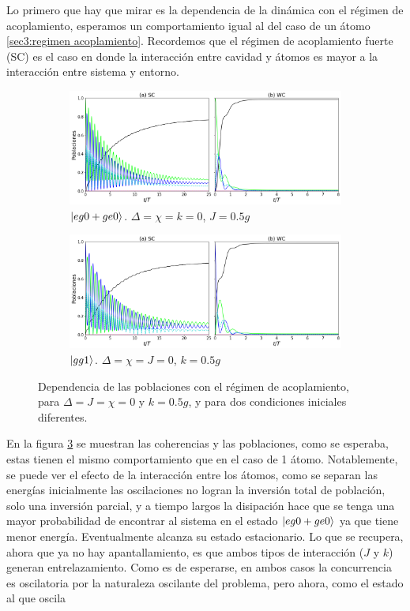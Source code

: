 Lo primero que hay que mirar es la dependencia de la dinámica con el régimen de acoplamiento, esperamos un comportamiento igual al del caso de un átomo \ref{sec3:regimen acoplamiento}. Recordemos que el régimen de acoplamiento fuerte (SC) es el caso en donde la interacción entre cavidad y átomos es mayor a la interacción entre sistema y entorno.
\begin{figure}[h]
    \centering
    \begin{subfigure}{0.7\textwidth}
        \includegraphics[width=\textwidth]{figuras/ch4/sc vs wc eg0 sim j0.5.png}
        \caption{$\ket{eg0+ge0}$. $\Delta=\chi=k=0$, $J=0.5g$}
        \label{fig4:acoplamiento eg0 sim}
    \end{subfigure}
    \vfill
    \begin{subfigure}{0.7\textwidth}
        \includegraphics[width=\textwidth]{figuras/ch4/sc vs wc gg1 k=0.5.png}
        \caption{$\ket{gg1}$. $\Delta=\chi=J=0$, $k=0.5g$ }
        \label{fig4:acoplamiento gg1}
    \end{subfigure}
    \caption{Dependencia de las poblaciones con el régimen de acoplamiento, para $\Delta=J=\chi=0$ y $k=0.5g$, y para dos condiciones iniciales diferentes.}
    \label{fig4:regimen acoplamiento}
\end{figure}
En  la figura \ref{fig4:regimen acoplamiento} se  muestran las coherencias y las poblaciones, como se esperaba, estas tienen el mismo comportamiento que en el caso de 1 átomo. Notablemente, se puede ver el efecto de la interacción entre los átomos, como se separan las energías inicialmente las oscilaciones no logran la inversión total de población, solo una inversión parcial, y a tiempo largos la disipación hace que se tenga una mayor probabilidad de encontrar al sistema en el estado $\ket{eg0+ge0}$ ya que tiene menor energía. Eventualmente alcanza su estado estacionario. Lo que se recupera, ahora que ya no hay apantallamiento, es que ambos tipos de interacción ($J$ y $k$) generan entrelazamiento. Como es de esperarse, en ambos casos la concurrencia es oscilatoria por la naturaleza oscilante del problema, pero ahora, como el estado al que oscila

